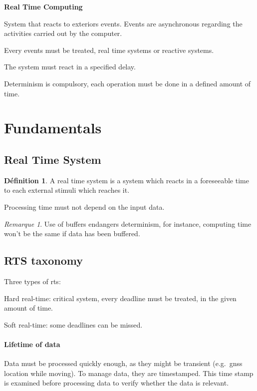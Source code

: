 \documentclass[10pt]{article}
\theoremstyle{plain}
\theoremstyle{definition}
\newtheorem{defn}{Définition}
\theoremstyle{remark}
\newtheorem{rem}{Remarque}
\begin{document}
\begin{center}
	\Large\textbf{Real Time Computing}
\end{center}
\begin{compactitem}
	\item System that reacts to exteriors events. Events are
		asynchronous regarding the activities carried out by the computer.
	\item Every events must be treated, real time systems or reactive systems.
	\item The system must react in a specified delay.
	\item Determinism is compulsory, each operation must be done in a defined
		amount of time.
\end{compactitem}

\section{Fundamentals}
\subsection{Real Time System}
\begin{defn}
	A real time system is a system which reacts in a foreseeable time to each
	external stimuli which reaches it.

	Processing time must not depend on the input data.
\end{defn}
\begin{rem}
	Use of buffers endangers determinism, for instance, computing time won't be
	the same if data has been buffered.
\end{rem}

\subsection{RTS taxonomy}
Three types of rts:
\begin{compactitem}
	\item Hard real-time: critical system, every deadline must be treated, in 
		the given amount of time.
	\item Soft real-time: some deadlines can be missed.
\end{compactitem}

\paragraph{Lifetime of data}
Data must be processed quickly enough, as they might be transient (e.g.\ gnss
location while moving). To manage data, they are timestamped. This time stamp is
examined before processing data to verify whether the data is relevant.
\end{document}
